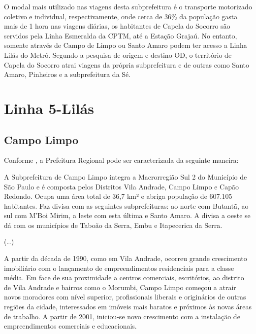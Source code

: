 	\begin{citacao}
		O modal mais utilizado nas viagens desta subprefeitura é o transporte motorizado coletivo e individual, respectivamente, onde cerca de 36\% da população gasta mais de 1 hora nas viagens diárias, os habitantes de Capela do Socorro são servidos pela Linha Esmeralda da CPTM, até a Estação Grajaú. No entanto, somente através de Campo de Limpo ou Santo Amaro podem ter acesso a Linha Lilás do Metrô. Segundo a pesquisa de origem e destino OD, o território de Capela do Socorro atrai viagens da própria subprefeitura e de outras como Santo Amaro, Pinheiros e a subprefeitura da Sé. \cite[pág. 106]{planosul2}
	\end{citacao}
	
	\section{Linha 5-Lilás}
	
	\subsection{Campo Limpo}
	
	Conforme , a Prefeitura Regional pode ser caracterizada da seguinte maneira:
	
	\begin{citacao}
		A Subprefeitura de Campo Limpo integra a Macrorregião Sul 2 do Município de São Paulo e é composta pelos Distritos Vila Andrade, Campo Limpo e Capão Redondo. Ocupa uma área total de 36,7 km² e abriga população de 607.105 habitantes. Faz divisa com as seguintes subprefeituras: ao norte com Butantã, ao sul com M’Boi Mirim, a leste com esta última e Santo Amaro. A divisa a oeste se dá com os municípios de Taboão da Serra, Embu e Itapecerica da Serra.
		
		(\dots)
		
		A partir da década de 1990, como em Vila Andrade, ocorreu grande crescimento imobiliário com o lançamento de empreendimentos residenciais para a classe média. Em face de sua proximidade a centros comerciais, escritórios, ao distrito de Vila Andrade e bairros como o Morumbi, Campo Limpo começou a atrair novos moradores com nível superior, profissionais liberais e originários de outras regiões da cidade, interessados em imóveis mais baratos e próximos às novas áreas de trabalho. A partir de 2001, iniciou-se novo crescimento com a instalação de empreendimentos comerciais e educacionais.
	\end{citacao}
	
